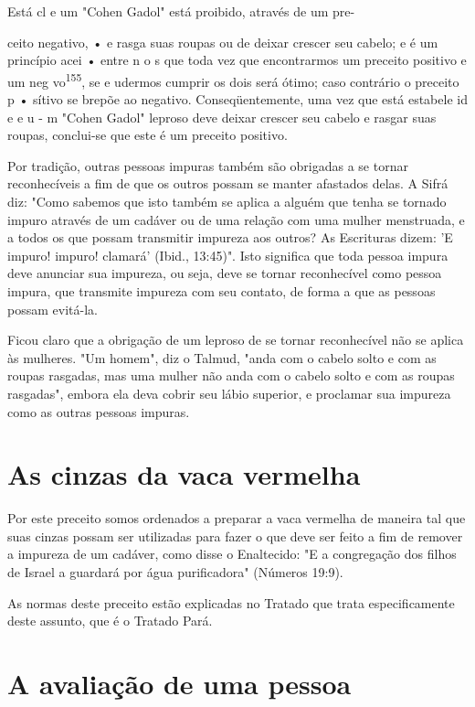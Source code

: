 \begin{itemize}
\begin{enumrate}
\begin{itemize}
\begin{itemize}
Está cl e um "Cohen Gadol" está proibido, através de um pre-

ceito negativo, • e rasga suas roupas ou de deixar crescer seu cabelo; e
é um princípio acei • entre n o s que toda vez que encontrarmos um
preceito positi­vo e um neg vo\textsuperscript{155}, se e udermos
cumprir os dois será ótimo; caso contrário o preceito p • sítivo se
brepõe ao negativo. Conseqüentemente, uma vez que está estabele id e e u
- m "Cohen Gadol" leproso deve deixar crescer seu ca­belo e rasgar suas
roupas, conclui-se que este é um preceito positivo.

Por tradição, outras pessoas impuras também são obrigadas a se tor­nar
reconhecíveis a fim de que os outros possam se manter afastados delas. A
Sifrá diz: "Como sabemos que isto também se aplica a alguém que tenha se
tor­nado impuro através de um cadáver ou de uma relação com uma mulher
mens­truada, e a todos os que possam transmitir impureza aos outros? As
Escrituras dizem: 'E impuro! impuro! clamará' (Ibid., 13:45)". Isto
significa que toda pes­soa impura deve anunciar sua impureza, ou seja,
deve se tornar reconhecível como pessoa impura, que transmite impureza
com seu contato, de forma a que as pessoas possam evitá-la.

Ficou claro que a obrigação de um leproso de se tornar reconhecí­vel não
se aplica às mulheres. "Um homem", diz o Talmud, "anda com o cabe­lo
solto e com as roupas rasgadas, mas uma mulher não anda com o cabelo
sol­to e com as roupas rasgadas", embora ela deva cobrir seu lábio
superior, e pro­clamar sua impureza como as outras pessoas impuras.

\section{As cinzas da vaca vermelha}

Por este preceito somos ordenados a preparar a vaca vermelha de maneira
tal que suas cinzas possam ser utilizadas para fazer o que deve ser
feito a fim de remover a impureza de um cadáver, como disse o
Enaltecido: "E a congregação dos filhos de Israel a guardará por água
purificadora" (Números 19:9).

As normas deste preceito estão explicadas no Tratado que trata
es­pecificamente deste assunto, que é o Tratado Pará.

\section{A avaliação de uma pessoa}


\end{itemize}
\end{itemize}
\end{enumrate}
\end{itemize}
